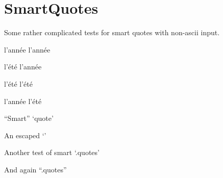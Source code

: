 
\def\mytitle{SmartQuotes Test}

\part{SmartQuotes}
\label{smartquotes}

Some rather complicated tests for smart quotes with non-ascii input.

l'année l'année

l'été l'année

l'été l'été

l'année l'été

``Smart'' `quote'

An escaped `\textbar{}'

Another test of smart `.quotes'

And again ``.quotes''




